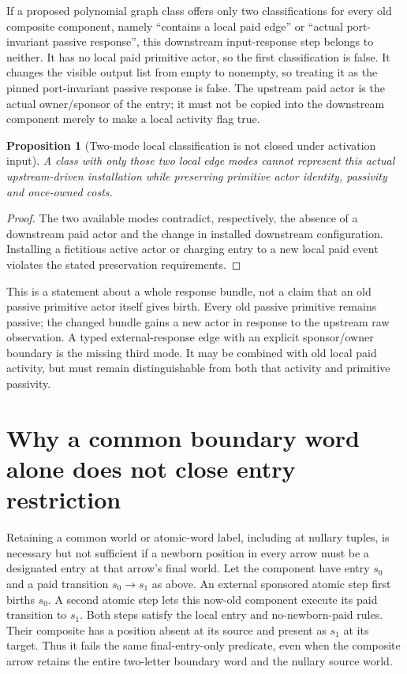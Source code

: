 \documentclass[11pt]{article}
\newtheorem{proposition}{Proposition}
\begin{document}
If a proposed polynomial graph class offers only two classifications for every old composite component, namely ``contains a local paid edge'' or ``actual port-invariant passive response'', this downstream input-response step belongs to neither. It has no local paid primitive actor, so the first classification is false. It changes the visible output list from empty to nonempty, so treating it as the pinned port-invariant passive response is false. The upstream paid actor is the actual owner/sponsor of the entry; it must not be copied into the downstream component merely to make a local activity flag true.

\begin{proposition}[Two-mode local classification is not closed under activation input]
A class with only those two local edge modes cannot represent this actual upstream-driven installation while preserving primitive actor identity, passivity and once-owned costs.
\end{proposition}
\begin{proof}
The two available modes contradict, respectively, the absence of a downstream paid actor and the change in installed downstream configuration. Installing a fictitious active actor or charging entry to a new local paid event violates the stated preservation requirements.\end{proof}

This is a statement about a whole response bundle, not a claim that an old passive primitive actor itself gives birth. Every old passive primitive remains passive; the changed bundle gains a new actor in response to the upstream raw observation. A typed external-response edge with an explicit sponsor/owner boundary is the missing third mode. It may be combined with old local paid activity, but must remain distinguishable from both that activity and primitive passivity.


\section{Why a common boundary word alone does not close entry restriction}
Retaining a common world or atomic-word label, including at nullary tuples, is necessary but not sufficient if a newborn position in every arrow must be a designated entry at that arrow's final world. Let the component have entry $s_0$ and a paid transition $s_0\to s_1$ as above. An external sponsored atomic step first births $s_0$. A second atomic step lets this now-old component execute its paid transition to $s_1$. Both steps satisfy the local entry and no-newborn-paid rules. Their composite has a position absent at its source and present as $s_1$ at its target. Thus it fails the same final-entry-only predicate, even when the composite arrow retains the entire two-letter boundary word and the nullary source world.
\end{document}
